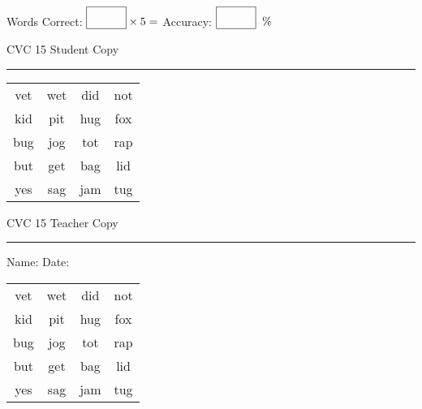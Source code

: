 \documentclass{memoir}
\begin{document}
\normalsize

Words Correct: $\fbox{\phantom{\huge 100}} \times 5 = $ Accuracy: $\fbox{\phantom{\huge 100}}\;\; \%$ 

\vfill

\newpage


\footnotesize \noindent
CVC 15 \hfill Student Copy
\smallskip
\hrule

\huge

\setlength{\tabcolsep}{14pt}
\def\arraystretch{2}

{\selectfont


\begin{vplace}[0.5]
\begin{center}
\begin{tabular}{cccc}
vet & wet & did & not \\
kid & pit & hug & fox \\
bug & jog & tot & rap \\
but & get & bag & lid \\
yes & sag & jam & tug \\
\end{tabular}
\end{center}
\end{vplace}

}

\newpage

\footnotesize \noindent
CVC 15 \hfill Teacher Copy
\smallskip
\hrule

\normalsize

\vfill

\noindent
Name: \underline{\hspace{1.75in}} \hfill Date: \underline{\hspace{1in}}

\huge

{\selectfont


\begin{vplace}[0.5]
\begin{center}
\begin{tabular}{cccc}
vet & wet & did & not \\
kid & pit & hug & fox \\
bug & jog & tot & rap \\
but & get & bag & lid \\
yes & sag & jam & tug \\
\end{tabular}
\end{center}
\end{vplace}



}
\end{document}
